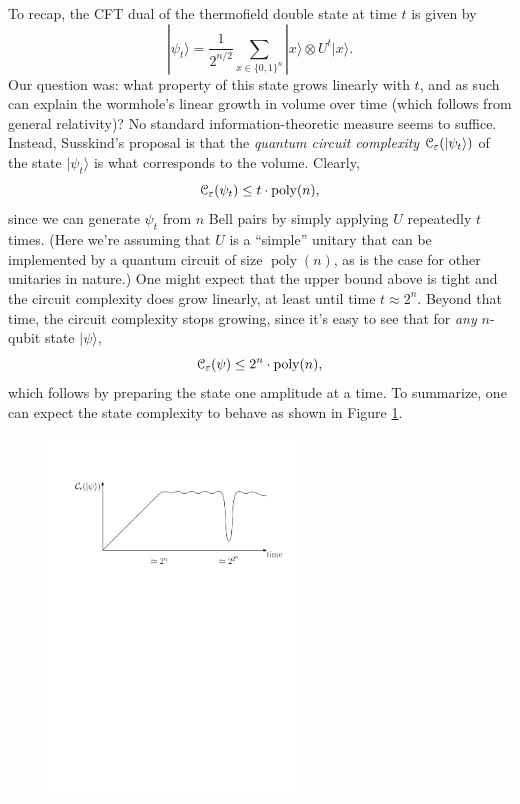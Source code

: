 \documentclass[11pt]{report}
\theoremstyle{plain}
\theoremstyle{definition}
\newcommand{\poly}{\operatorname{poly}}
\newcommand{\eps}{\varepsilon}
\renewcommand{\ket}[1]{|#1\rangle}
\begin{document}
To recap, the CFT dual of the thermofield double state at time $t$ is given by
\[
\ket{\psi_t} = \frac{1}{2^{n/2}} \sum_{x \in \{0,1\}^n} \ket{x} \otimes U^t \ket{x}.
\]
Our question was: what property of this state grows linearly with $t$, and as such can explain the wormhole's linear growth in volume over time (which follows from general relativity)? No standard information-theoretic measure seems to suffice. Instead, Susskind's proposal is that the \emph{quantum circuit complexity} ${\cal C}_{\eps}(\ket{\psi_t})$ of the state $\ket{\psi_t}$ is what corresponds to the volume.  Clearly,
\[
{\cal C}_\eps(\psi_t) \le t \cdot \poly(n),
\]
since we can generate $\psi_t$ from $n$ Bell pairs by simply applying $U$ repeatedly $t$ times. (Here we're assuming that $U$ is a ``simple'' unitary that can be implemented by a quantum circuit of size $\poly(n)$, as is the case for
other unitaries in nature.)  One might expect that the upper bound above is tight and the circuit complexity does grow linearly, at least until time $t\approx 2^n$. Beyond that time, the circuit complexity stops growing, since it's easy to see that for \emph{any} $n$-qubit state $\ket{\psi}$,
\[
{\cal C}_\eps(\psi) \le 2^{n} \cdot \poly(n),
\]
which follows by preparing the state one amplitude at a time.
To summarize, one can expect the state complexity to behave as shown in Figure \ref{complexitygraph}.

\begin{figure}[ht]
\label{complexitygraph}
\begin{center}
\includegraphics[width= 0.6\textwidth]{lec8_wormhole_plot}
\end{center}
\end{figure}
\end{document}
